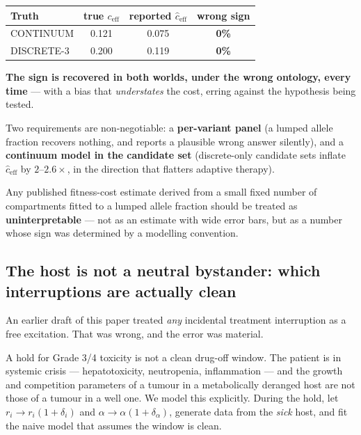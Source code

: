 \documentclass[11pt,a4paper]{article}
\newcommand{\ceff}{c_{\mathrm{eff}}}
\begin{document}
\begin{center}
\begin{tabular}{lccc}
\toprule
\textbf{Truth} & \textbf{true $\ceff$} & \textbf{reported $\hat{c}_{\mathrm{eff}}$} & \textbf{wrong sign}\\
\midrule
CONTINUUM & 0.121 & 0.075 & \textbf{0\%}\\
DISCRETE-3 & 0.200 & 0.119 & \textbf{0\%}\\
\bottomrule
\end{tabular}
\end{center}

\textbf{The sign is recovered in both worlds, under the wrong ontology, every
time} --- with a bias that \emph{understates} the cost, erring against the
hypothesis being tested.

Two requirements are non-negotiable: a \textbf{per-variant panel} (a lumped allele
fraction recovers nothing, and reports a plausible wrong answer silently), and a
\textbf{continuum model in the candidate set} (discrete-only candidate sets inflate
$\hat{c}_{\mathrm{eff}}$ by $2$--$2.6\times$, in the direction that flatters
adaptive therapy).

\begin{tcolorbox}[keybox]
Any published fitness-cost estimate derived from a small fixed number of
compartments fitted to a lumped allele fraction should be treated as
\textbf{uninterpretable} --- not as an estimate with wide error bars, but as a
number whose sign was determined by a modelling convention.
\end{tcolorbox}


\subsection{The host is not a neutral bystander: which interruptions are actually clean}

An earlier draft of this paper treated \emph{any} incidental treatment interruption
as a free excitation. That was wrong, and the error was material.

A hold for Grade 3/4 toxicity is not a clean drug-off window. The patient is in
systemic crisis --- hepatotoxicity, neutropenia, inflammation --- and the growth and
competition parameters of a tumour in a metabolically deranged host are not those of
a tumour in a well one. We model this explicitly. During the hold, let
$r_i \to r_i(1 + \delta_i)$ and $\alpha \to \alpha(1 + \delta_\alpha)$, generate data
from the \emph{sick} host, and fit the naive model that assumes the window is clean.
\end{document}
